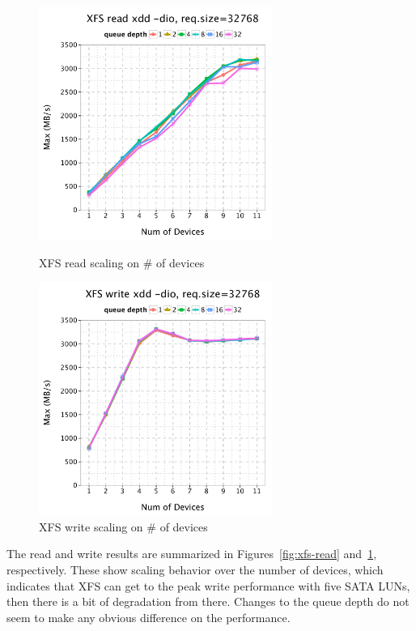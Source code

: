 \documentclass{article}
\begin{document}
\begin{figure}[htb]
\centering
\begin{minipage}[t]{0.5\linewidth}
\centering
\includegraphics[width=3in]{data/xdd-read}
\caption{XFS read scaling on \# of devices}
\label{fig:xfs-read}
\end{minipage}%
\begin{minipage}[t]{0.5\linewidth}
\centering
\includegraphics[width=3in]{data/xdd-write}
\caption{XFS write scaling on \# of devices}
\label{fig:xfs-write}
\end{minipage}%
\end{figure}

The read and write results are summarized in Figures~\ref{fig:xfs-read}
and~\ref{fig:xfs-write}, respectively. These show scaling behavior over the number of devices, which
indicates that XFS can get to the peak write performance with five SATA LUNs,
then there is a bit of degradation from there. Changes to
the queue depth do not seem to make any obvious difference on the performance.
\end{document}
